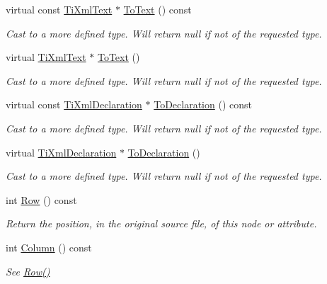 \begin{DoxyCompactItemize}
virtual const \hyperlink{classTiXmlText}{TiXmlText} $\ast$ \hyperlink{classTiXmlNode_a95a46a52c525992d6b4ee08beb14cd69}{ToText} () const 
\begin{DoxyCompactList}\small\item\em Cast to a more defined type. Will return null if not of the requested type. \item\end{DoxyCompactList}\item 
virtual \hyperlink{classTiXmlText}{TiXmlText} $\ast$ \hyperlink{classTiXmlNode_a3ddfbcac78fbea041fad57e5c6d60a03}{ToText} ()
\begin{DoxyCompactList}\small\item\em Cast to a more defined type. Will return null if not of the requested type. \item\end{DoxyCompactList}\item 
virtual const \hyperlink{classTiXmlDeclaration}{TiXmlDeclaration} $\ast$ \hyperlink{classTiXmlNode_a9f43e6984fc7d4afd6eb32714c6b7b72}{ToDeclaration} () const 
\begin{DoxyCompactList}\small\item\em Cast to a more defined type. Will return null if not of the requested type. \item\end{DoxyCompactList}\item 
virtual \hyperlink{classTiXmlDeclaration}{TiXmlDeclaration} $\ast$ \hyperlink{classTiXmlNode_a4027136ca820ff4a636b607231b6a6df}{ToDeclaration} ()
\begin{DoxyCompactList}\small\item\em Cast to a more defined type. Will return null if not of the requested type. \item\end{DoxyCompactList}\item 
int \hyperlink{classTiXmlBase_a024bceb070188df92c2a8d8852dd0853}{Row} () const 
\begin{DoxyCompactList}\small\item\em Return the position, in the original source file, of this node or attribute. \item\end{DoxyCompactList}\item 
int \hyperlink{classTiXmlBase_ab54bfb9b70fe6dd276e7b279cab7f003}{Column} () const 
\begin{DoxyCompactList}\small\item\em See \hyperlink{classTiXmlBase_a024bceb070188df92c2a8d8852dd0853}{Row()} \item\end{DoxyCompactList}\item 

\end{DoxyCompactItemize}
